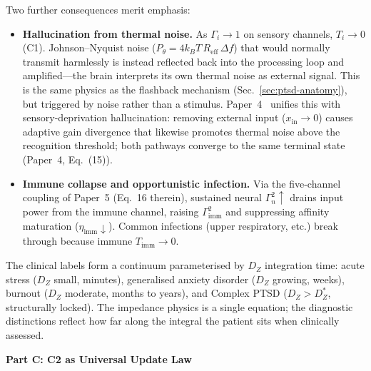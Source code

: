 \documentclass[aps,pre,twocolumn,superscriptaddress,floatfix]{revtex4-2}
\begin{document}
\noindent
Two further consequences merit emphasis:
\begin{itemize}
  \item \textbf{Hallucination from thermal noise.}
    As $\Gamma_i \to 1$ on sensory channels,
    $T_i \to 0$ (C1).
    Johnson--Nyquist noise
    ($P_\theta = 4k_BT\,R_{\text{eff}}\,\Delta f$)
    that would normally transmit harmlessly is instead
    reflected back into the processing loop and
    amplified---the brain interprets its own thermal
    noise as external signal.
    This is the same physics as the
    flashback mechanism (Sec.~\ref{sec:ptsd-anatomy}),
    but triggered by noise rather than a stimulus.
    Paper~4~\cite{Paper4} unifies this with
    sensory-deprivation hallucination: removing
    external input ($x_{\text{in}} \to 0$) causes
    adaptive gain divergence that likewise promotes
    thermal noise above the recognition threshold;
    both pathways converge to the same terminal
    state (Paper~4, Eq.~(15)).
  \item \textbf{Immune collapse and opportunistic infection.}
    Via the five-channel coupling of Paper~5
    (Eq.~16 therein),
    sustained neural $\Gamma_n^2\!\uparrow$ drains
    input power from the immune channel,
    raising $\Gamma_{\text{imm}}^2$ and suppressing
    affinity maturation ($\eta_{\text{imm}}\!\downarrow$).
    Common infections (upper respiratory, etc.)
    break through because immune $T_{\text{imm}} \to 0$.
\end{itemize}

\begin{remark}
\label{rem:anxiety-spectrum}
The clinical labels form a continuum
parameterised by $D_Z$ integration time:
acute stress ($D_Z$ small, minutes),
generalised anxiety disorder ($D_Z$ growing, weeks),
burnout ($D_Z$ moderate, months to years),
and Complex PTSD ($D_Z > D_Z^*$, structurally locked).
The impedance physics is a single equation;
the diagnostic distinctions reflect how far along
the integral the patient sits when clinically assessed.
\end{remark}


\bigskip\noindent\textbf{\large Part C: C2 as Universal Update Law}
\bigskip


\end{document}
